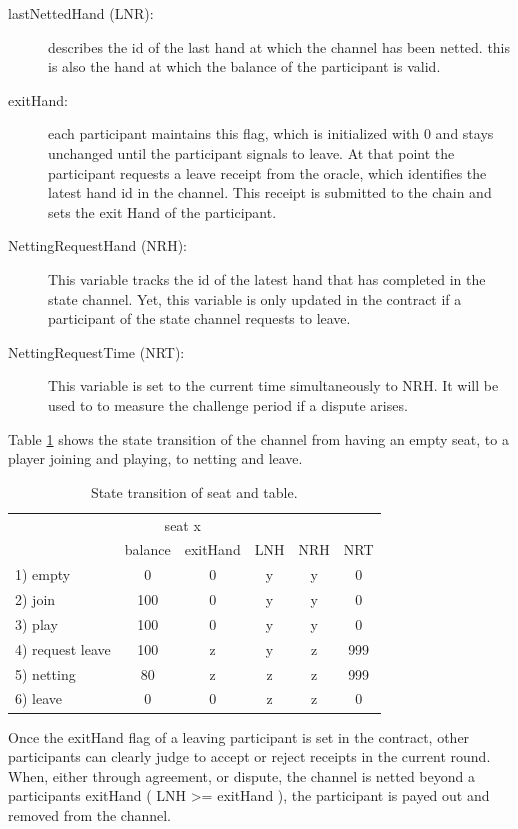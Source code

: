 \begin{description}
\item[lastNettedHand (LNR):] describes the id of the last hand at which the channel has been netted. this is also the hand at which the balance of the participant is valid.
\item[exitHand:] each participant maintains this flag, which is initialized with 0 and stays unchanged until the participant signals to leave. At that point the participant requests a leave receipt from the oracle, which identifies the latest hand id in the channel. This receipt is submitted to the chain and sets the exit Hand of the participant.
\item[NettingRequestHand (NRH):] This variable tracks the id of the latest hand that has completed in the state channel. Yet, this variable is only updated in the contract if a participant of the state channel requests to leave.
\item[NettingRequestTime (NRT):] This variable is set to the current time simultaneously to NRH. It will be used to to measure the challenge period if a dispute arises.
\end{description}

Table \ref{fsm-table} shows the state transition of the channel from having an empty seat, to a player joining and playing, to netting and leave. 


\begin{table}[ht]
\centering
\caption{State transition of seat and table.}
\label{fsm-table}
\begin{tabular}{lccccc}
\hline
                 & \multicolumn{2}{c}{seat x} & \multicolumn{1}{l}{} & \multicolumn{1}{l}{} & \multicolumn{1}{l}{} \\ 
                 & balance     & exitHand     & LNH                  & NRH                  & NRT                  \\ \hline
1) empty         & 0           & 0            & y                    & y                    & 0                    \\
2) join          & 100         & 0            & y                    & y                    & 0                    \\
3) play          & 100         & 0            & y                    & y                    & 0                    \\
4) request leave & 100         & z            & y                    & z                    & 999                  \\
5) netting       & 80          & z            & z                    & z                    & 999                  \\
6) leave         & 0           & 0            & z                    & z                    & 0                    \\ \hline
\end{tabular}
\end{table}

Once the exitHand flag of a leaving participant is set in the contract, other participants can clearly judge to accept or reject receipts in the current round. When, either through agreement, or dispute, the channel is netted beyond a participants exitHand ( LNH >= exitHand ), the participant is payed out and removed from the channel. 
